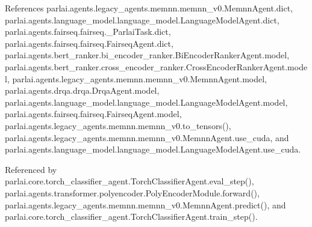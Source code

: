 References parlai.\+agents.\+legacy\+\_\+agents.\+memnn.\+memnn\+\_\+v0.\+Memnn\+Agent.\+dict, parlai.\+agents.\+language\+\_\+model.\+language\+\_\+model.\+Language\+Model\+Agent.\+dict, parlai.\+agents.\+fairseq.\+fairseq.\+\_\+\+Parlai\+Task.\+dict, parlai.\+agents.\+fairseq.\+fairseq.\+Fairseq\+Agent.\+dict, parlai.\+agents.\+bert\+\_\+ranker.\+bi\+\_\+encoder\+\_\+ranker.\+Bi\+Encoder\+Ranker\+Agent.\+model, parlai.\+agents.\+bert\+\_\+ranker.\+cross\+\_\+encoder\+\_\+ranker.\+Cross\+Encoder\+Ranker\+Agent.\+model, parlai.\+agents.\+legacy\+\_\+agents.\+memnn.\+memnn\+\_\+v0.\+Memnn\+Agent.\+model, parlai.\+agents.\+drqa.\+drqa.\+Drqa\+Agent.\+model, parlai.\+agents.\+language\+\_\+model.\+language\+\_\+model.\+Language\+Model\+Agent.\+model, parlai.\+agents.\+fairseq.\+fairseq.\+Fairseq\+Agent.\+model, parlai.\+agents.\+legacy\+\_\+agents.\+memnn.\+memnn\+\_\+v0.\+to\+\_\+tensors(), parlai.\+agents.\+legacy\+\_\+agents.\+memnn.\+memnn\+\_\+v0.\+Memnn\+Agent.\+use\+\_\+cuda, and parlai.\+agents.\+language\+\_\+model.\+language\+\_\+model.\+Language\+Model\+Agent.\+use\+\_\+cuda.



Referenced by parlai.\+core.\+torch\+\_\+classifier\+\_\+agent.\+Torch\+Classifier\+Agent.\+eval\+\_\+step(), parlai.\+agents.\+transformer.\+polyencoder.\+Poly\+Encoder\+Module.\+forward(), parlai.\+agents.\+legacy\+\_\+agents.\+memnn.\+memnn\+\_\+v0.\+Memnn\+Agent.\+predict(), and parlai.\+core.\+torch\+\_\+classifier\+\_\+agent.\+Torch\+Classifier\+Agent.\+train\+\_\+step().

